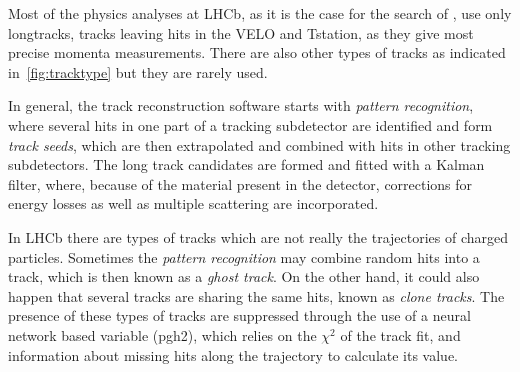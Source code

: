 Most of the physics analyses at \gls{LHCb}, as it is the case for the search of \Bmumumu, use only \gls{longtrack}s, tracks leaving hits in the \Gls{VELO} and \Gls{Tstation}, as they give most precise momenta measurements. There are also other types of tracks as indicated in~\autoref{fig:tracktype} but they are rarely used.

In general, the track reconstruction software starts with \textit{pattern recognition}, where several hits in one part of a tracking subdetector are identified and form \textit{track seeds}, which are then extrapolated and combined with hits in other tracking subdetectors. The long track candidates are formed and fitted with a Kalman filter\cite{Hierk:684697}, where, because of the material present in the detector, corrections for energy losses as well as multiple scattering are incorporated.

In \gls{LHCb} there are types of tracks which are not really the trajectories of charged particles.
Sometimes the \textit{pattern recognition} may combine random hits into a track, which is then known as a \textit{ghost track}. On the other hand, it could also happen that several tracks are sharing the same hits, known as \textit{clone tracks}. The presence of these types of tracks are suppressed through the use of a neural network based variable (\Gls{pgh2}), which relies on the $\chi^{2}$ of the track fit, and information about missing hits along the trajectory to calculate its value.

